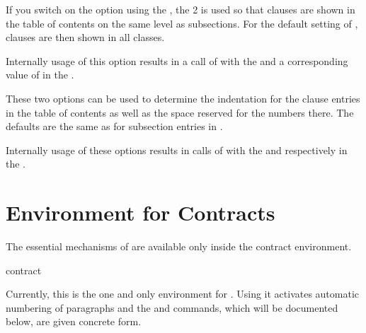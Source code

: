 If you switch on the option using the %
, the  2 is used
so that clauses are shown in the table of contents on the same level as
subsections. For the default setting of ,
clauses are then shown in all \KOMAScript{} classes.

Internally usage of this option results in
a call of
with the   and a corresponding value of
 in the .%
\EndIndexGroup


\begin{Declaration}
\end{Declaration}
These two options can be used to determine the indentation for the clause
entries in the table of contents as well as the space reserved for the numbers
there. The defaults are the same as for subsection entries in
.

Internally usage of these options results
in calls of
with the   and 
respectively  in the .%
\EndIndexGroup


\section{Environment for Contracts}

\BeginIndexGroup
{}
The essential mechanisms of  are available only inside the
contract environment.

\begin{Declaration}
  \begin{Environment}{contract}\end{Environment}
\end{Declaration}
Currently, this is the one and only environment for . Using
it activates automatic numbering of paragraphs and the
 and 
commands, which will be documented below, are given concrete form.

